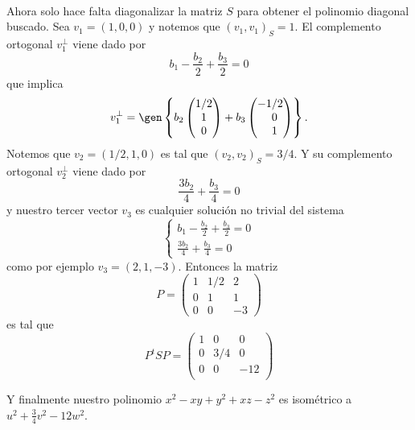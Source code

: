 \documentclass[twocolumn]{notasdeclase}
\newcommand{\bform}[2]{(#1,#2)}
\begin{document}
\begin{sol}
\begin{align*}
	 \end{align*}
	 Ahora solo hace falta diagonalizar la matriz $S$ para obtener el polinomio diagonal buscado. Sea $v_1 = (1,0,0)$ y notemos que $\bform{v_1}{v_1}_S = 1$. El complemento ortogonal $v_1^\perp$ viene dado por
	 \[ b_1-\frac{b_2}{2}+\frac{b_3}{2} = 0 \]
	 que implica
	 \[ v_1^\perp = \gen\left\{ b_2\begin{pmatrix}
	 1/2 \\ 1 \\ 0
	 \end{pmatrix} + b_3\begin{pmatrix}
	 -1/2 \\ \phantom{-}0 \\ \phantom{-}1
	 \end{pmatrix} \right\}. \]
	 Notemos que $v_2=(1/2,1,0)$ es tal que $\bform{v_2}{v_2}_S = 3/4$. Y su complemento ortogonal $v_2^\perp$ viene dado por
	 \[ \frac{3b_2}{4}+ \frac{b_3}{4} = 0\]
	 y nuestro tercer vector $v_3$ es cualquier solución no trivial del sistema
	 \[ \begin{cases}\displaystyle
	 b_1-\frac{b_2}{2}+\frac{b_3}{2} = 0 \\[.5em] \displaystyle
	 \frac{3b_2}{4}+ \frac{b_3}{4} = 0
	 \end{cases} \]
	 como por ejemplo $v_3 = (2,1,-3)$. Entonces la matriz 
	 \[ P = \begin{pmatrix}
	 1 & 1/2 & 2\\
	 0 & 1 & 1\\
	 0 & 0 & -3
	 \end{pmatrix} \]
	 es tal que
	 \[ P^tSP = \begin{pmatrix}
	 1 & 0 & 0 \\
	 0 & 3/4 & 0 \\
	 0 & 0 & -12 \\
	 \end{pmatrix} \]

Y finalmente nuestro polinomio $x^2-xy+y^2+xz-z^2$ es isométrico a $u^2+\frac{3}{4}v^2 -12 w^2$.


\end{sol}
\end{document}
